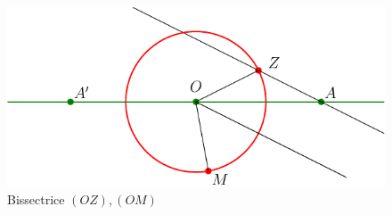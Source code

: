 \begin{figure}[!ht]
 \centering
 \includegraphics{Ccomp8_1.pdf}
 \caption{Bissectrice $(OZ),(OM)$}
 \label{fig:Ccomp8_1}
\end{figure}

